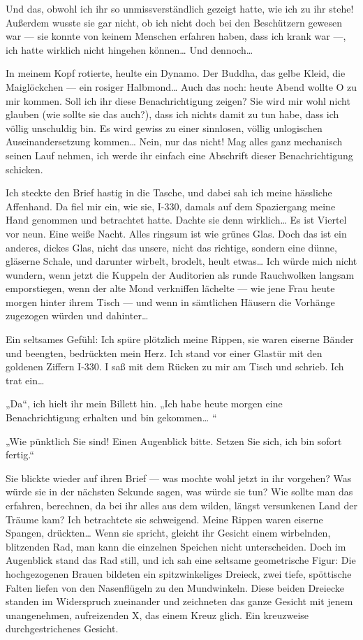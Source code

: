 Und das, obwohl ich ihr so unmissverständlich gezeigt hatte, wie
ich zu ihr stehe! Außerdem wusste sie gar nicht, ob ich nicht doch
bei den Beschützern gewesen war — sie konnte von keinem Menschen
erfahren haben, dass ich krank war —, ich hatte wirklich nicht
hingehen können\ldots{} Und dennoch\ldots{}

In meinem Kopf rotierte, heulte ein Dynamo. Der Buddha, das gelbe
Kleid, die Maiglöckchen — ein rosiger Halbmond\ldots{} Auch das noch:
heute Abend wollte O zu mir kommen. Soll ich ihr diese
Benachrichtigung zeigen? Sie wird mir wohl nicht glauben (wie
sollte sie das auch?), dass ich nichts damit zu tun habe, dass ich
völlig unschuldig bin. Es wird gewiss zu einer sinnlosen, völlig
unlogischen Auseinandersetzung kommen\ldots{} Nein, nur
das nicht! Mag alles ganz mechanisch seinen Lauf nehmen, ich werde
ihr einfach eine Abschrift dieser Benachrichtigung schicken.

Ich steckte den Brief hastig in die Tasche, und dabei sah ich meine
hässliche Affenhand. Da fiel mir ein, wie sie, I-330, damals auf
dem Spaziergang meine Hand genommen und betrachtet hatte. Dachte
sie denn wirklich\ldots{} Es ist Viertel vor neun. Eine weiße Nacht.
Alles ringsum ist wie grünes Glas. Doch das ist ein anderes, dickes
Glas, nicht das unsere, nicht das richtige, sondern eine dünne,
gläserne Schale, und darunter wirbelt, brodelt, heult etwas\ldots{} Ich
würde mich nicht wundern, wenn jetzt die Kuppeln der Auditorien als
runde Rauchwolken langsam emporstiegen, wenn der alte Mond
verkniffen lächelte — wie jene Frau heute morgen hinter ihrem Tisch
— und wenn in sämtlichen Häusern die Vorhänge zugezogen würden und
dahinter\ldots{}

Ein seltsames Gefühl: Ich spüre plötzlich meine Rippen, sie waren
eiserne Bänder und beengten, bedrückten mein Herz. Ich stand vor
einer Glastür mit den goldenen Ziffern I-330. I saß mit dem Rücken
zu mir am Tisch und schrieb. Ich trat ein\ldots{}

„Da“, ich hielt ihr mein Billett hin. „Ich habe heute morgen eine
Benachrichtigung erhalten und bin gekommen\ldots{} “

„Wie pünktlich Sie sind! Einen Augenblick bitte. Setzen Sie sich,
ich bin sofort fertig.“

Sie blickte wieder auf ihren Brief — was mochte wohl jetzt in ihr
vorgehen? Was würde sie in der nächsten Sekunde sagen, was würde
sie tun? Wie sollte man das erfahren, berechnen, da bei ihr alles
aus dem wilden, längst versunkenen Land der Träume kam? Ich
betrachtete sie schweigend. Meine Rippen waren eiserne Spangen,
drückten\ldots{} Wenn sie spricht, gleicht ihr Gesicht einem wirbelnden,
blitzenden Rad, man kann die einzelnen Speichen nicht
unterscheiden. Doch im Augenblick stand das Rad still, und ich sah
eine seltsame geometrische Figur: Die hochgezogenen Brauen bildeten
ein spitzwinkeliges Dreieck, zwei tiefe, spöttische Falten liefen
von den Nasenflügeln zu den Mundwinkeln. Diese beiden Dreiecke
standen im Widerspruch zueinander und zeichneten das ganze Gesicht
mit jenem unangenehmen, aufreizenden X, das einem Kreuz glich. Ein
kreuzweise durchgestrichenes Gesicht.

